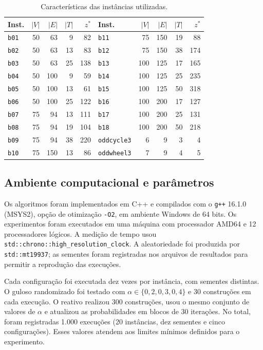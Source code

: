 \documentclass[12pt]{article}
\begin{document}
\begin{table}[htbp]
\centering
\caption{Características das instâncias utilizadas.}
\label{tab:instancias}
\scriptsize
\setlength{\tabcolsep}{5pt}
\begin{tabular}{lrrrr@{\hspace{9mm}}lrrrr}
\toprule
\textbf{Inst.} & $|V|$ & $|E|$ & $|T|$ & $z^*$ & \textbf{Inst.} & $|V|$ & $|E|$ & $|T|$ & $z^*$\\
\midrule
\texttt{b01} & 50 & 63 & 9 & 82 & \texttt{b11} & 75 & 150 & 19 & 88\\
\texttt{b02} & 50 & 63 & 13 & 83 & \texttt{b12} & 75 & 150 & 38 & 174\\
\texttt{b03} & 50 & 63 & 25 & 138 & \texttt{b13} & 100 & 125 & 17 & 165\\
\texttt{b04} & 50 & 100 & 9 & 59 & \texttt{b14} & 100 & 125 & 25 & 235\\
\texttt{b05} & 50 & 100 & 13 & 61 & \texttt{b15} & 100 & 125 & 50 & 318\\
\texttt{b06} & 50 & 100 & 25 & 122 & \texttt{b16} & 100 & 200 & 17 & 127\\
\texttt{b07} & 75 & 94 & 13 & 111 & \texttt{b17} & 100 & 200 & 25 & 131\\
\texttt{b08} & 75 & 94 & 19 & 104 & \texttt{b18} & 100 & 200 & 50 & 218\\
\texttt{b09} & 75 & 94 & 38 & 220 & \texttt{oddcycle3} & 6 & 9 & 3 & 4\\
\texttt{b10} & 75 & 150 & 13 & 86 & \texttt{oddwheel3} & 7 & 9 & 4 & 5\\
\bottomrule
\end{tabular}
\end{table}

\subsection{Ambiente computacional e parâmetros}

Os algoritmos foram implementados em C++ e compilados com o \texttt{g++} 16.1.0 (MSYS2), opção de otimização \texttt{-O2}, em ambiente Windows de 64 bits. Os experimentos foram executados em uma máquina com processador AMD64 e 12 processadores lógicos. A medição de tempo usou \texttt{std::chrono::high\_resolution\_clock}. A aleatoriedade foi produzida por \texttt{std::mt19937}; as sementes foram registradas nos arquivos de resultados para permitir a reprodução das execuções.

Cada configuração foi executada dez vezes por instância, com sementes distintas. O guloso randomizado foi testado com $\alpha\in\{0{,}2,0{,}3,0{,}4\}$ e 30 construções em cada execução. O reativo realizou 300 construções, usou o mesmo conjunto de valores de $\alpha$ e atualizou as probabilidades em blocos de 30 iterações. No total, foram registradas 1.000 execuções (20 instâncias, dez sementes e cinco configurações). Esses valores atendem aos limites mínimos definidos para o experimento.
\end{document}
